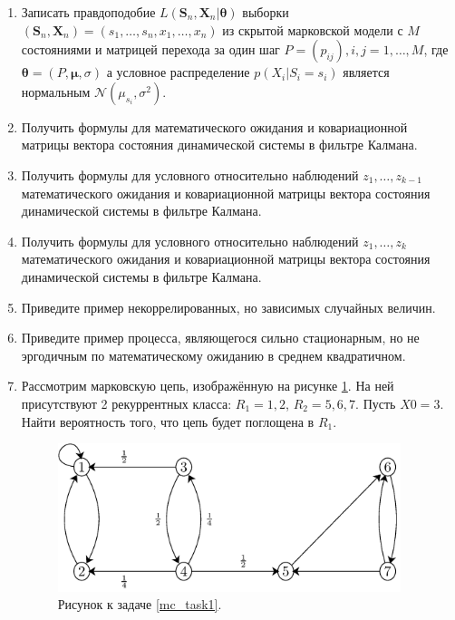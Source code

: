 \documentclass[a4paper,12pt]{extreport}
\renewcommand{\=}[1]{\stackrel{#1}{=}} %
\begin{document}
\begin{enumerate}
	\item Записать правдоподобие $L(\bm{S}_n, \bm{X}_n| \bm{\theta})$
	выборки $(\bm{S}_n, \bm{X}_n) = (s_1, \ldots, s_n, x_1, \ldots, x_n)$ из
	скрытой марковской модели с $M$ состояниями и матрицей
	перехода за один шаг $P = (p_{ij}), i, j = 1, \ldots, M$,
	где $\bm{\theta} = (P, \bm{\mu}, \sigma)$
	а условное распределение $p(X_i | S_i = s_i)$ является
	нормальным $\mathcal{N}(\mu_{s_i}, \sigma^2)$.

	\item Получить формулы для математического ожидания и ковариационной матрицы
	вектора состояния динамической системы в фильтре Калмана.
	\item Получить формулы для условного относительно наблюдений $z_1, \ldots, z_{k-1}$
	математического ожидания и ковариационной матрицы
	вектора состояния динамической системы в фильтре Калмана.
	\item Получить формулы для условного относительно наблюдений $z_1, \ldots, z_k$
	математического ожидания и ковариационной матрицы
	вектора состояния динамической системы в фильтре Калмана.

	\item Приведите пример некоррелированных, но зависимых случайных величин.

	\item Приведите пример процесса, являющегося сильно стационарным, 
	но не эргодичным по математическому ожиданию в среднем квадратичном.

	\item \label{mc_task1} Рассмотрим марковскую цепь, изображённую на рисунке
	\ref{fig:task}. На ней присутствуют 2 рекуррентных класса:
	$R_1={1,2}$, $R_2={5,6,7}$. Пусть $X0=3$. Найти вероятность того,
	что цепь будет поглощена в $R_1$.
    
    \begin{figure}[h!]
	\centering
	\includegraphics[width=10cm]{img/MC-diagram-rec-abs}
	\caption{Рисунок к задаче \ref{mc_task1}.}
	\label{fig:task}
	\end{figure}


\end{enumerate}
\end{document}
